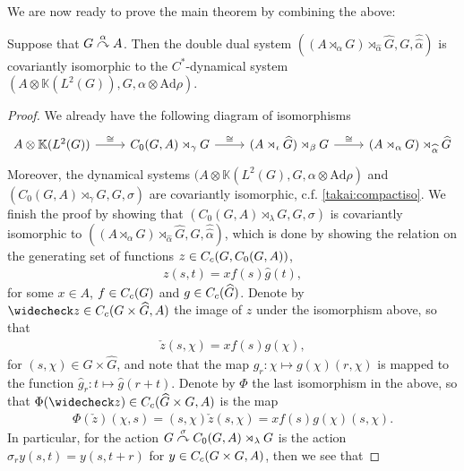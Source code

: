 We are now ready to prove the main theorem by combining the above:
\begin{theorem}
	Suppose that $G \stackrel{\alpha}{\curvearrowright} A$. Then the double dual system $\left( (A \rtimes_\alpha G) \rtimes_{\hat \alpha} \hat G, G, \hat{\hat{\alpha}} \right)$ is covariantly isomorphic to the $C^*$-dynamical system $(A \otimes \mathbb{K}(L^2(G)), G, \alpha \otimes \mathrm{Ad} \rho)$.	
	\label{takai:takai}
\end{theorem}
\begin{proof}
	We already have the following diagram of isomorphisms
	\begin{equation*}
		\begin{tikzcd}
			A \otimes \mathbb{K}(L^2(G)) \ar[r,"\cong"] & C_0(G,A) \rtimes_{\gamma} G \ar[r, "\cong"] & (A \rtimes_\iota \hat G) \rtimes_\beta G \ar[r, "\cong"] & (A \rtimes_\alpha G) \rtimes_{\hat \alpha} \hat G
		\end{tikzcd}
	\end{equation*}
	Moreover, the dynamical systems $(A \otimes \mathbb{K}(L^2(G), G, \alpha \otimes \mathrm{Ad} \rho)$ and $(C_0(G,A) \rtimes_{\gamma} G, G, \sigma)$ are covariantly isomorphic, c.f. \cref{takai:compactiso}. We finish the proof by showing that $(C_0(G,A) \rtimes_{\lambda} G, G, \sigma)$ is covariantly isomorphic to $( (A \rtimes_{\alpha} G)\rtimes_{\hat \alpha} \hat G, G, \hat{\hat{\alpha}})$, which is done by showing the relation on the generating set of functions $z \in C_c(G,C_0(G,A))$, 
	\begin{align*}
		z(s,t) =x f(s) \hat g(t),
	\end{align*}
	for some $x \in A$, $f \in C_c(G)$ and $g \in C_c(\widehat{G})$. Denote by $\check z \in \cc(G \times \hat G, A)$ the image of $z$ under the isomorphism above, so that
	\begin{align*}
		\check z(s,\chi) = x f(s) g(\chi),
	\end{align*}
	for $(s,\chi) \in G \times \hat G$, and note that the map $g_r \colon \chi \mapsto g(\chi)(r,\chi)$ is mapped to the function $\hat g_r \colon t \mapsto \hat g(r+t)$. Denote by $\Phi$ the last isomorphism in the above, so that $\Phi(\check z) \in \cc(\hat G\times  G, A)$ is the map
	\begin{align*}
		\Phi(\check z)(\chi,s) = (s,\chi) \check z(s,\chi) = x f(s) g(\chi) (s,\chi).
	\end{align*}
	In particular, for the action $G \stackrel{\sigma}{\curvearrowright} C_0(G,A) \rtimes_{\lambda} G$ is the action $\sigma_r y(s,t) = y(s,t+r)$ for $y \in C_c(G \times G,A)$, then we see that

\end{proof}
